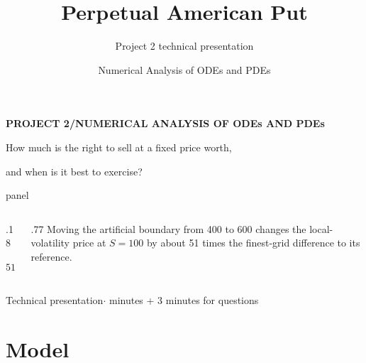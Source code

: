 \documentclass[aspectratio=169,11pt]{beamer}
\title{Perpetual American Put}
\author{Project 2 technical presentation}
\date{Numerical Analysis of ODEs and PDEs}
\newcommand{\panel}[1]{%
  \begin{beamercolorbox}[wd=\linewidth,sep=2.2mm]{panel}#1\end{beamercolorbox}}
\begin{document}
\begin{frame}[plain]
  \vspace{3mm}
  {\small\bfseries\color{Teal} PROJECT 2\enspace /\enspace NUMERICAL ANALYSIS OF ODEs AND PDEs\par}
  \vspace{5mm}
  {\fontsize{34}{38}\selectfont\bfseries\inserttitle\par}
  \vspace{2mm}
  {\large How much is the right to sell at a fixed price worth,\par
  and when is it best to exercise?\par}
  \vfill
  \panel{%
    \begin{columns}[T,onlytextwidth]
      \begin{column}{.18\linewidth}
        {\LARGE\bfseries\color{Teal}$51\times$\par}
      \end{column}
      \begin{column}{.77\linewidth}
        Moving the artificial boundary from 400 to 600 changes the local-volatility
        price at $S=100$ by about 51 times the finest-grid difference to its reference.
      \end{column}
    \end{columns}
  }
  \vspace{3mm}
  {\footnotesize\color{Muted}Technical presentation\enspace $\cdot$ minutes + 3 minutes for questions\par}
\end{frame}

\section{Model}
\end{document}
